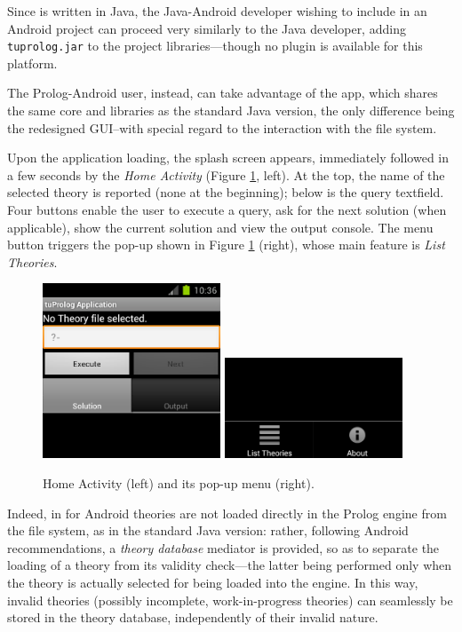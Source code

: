 Since \tuprolog{} is written in Java, the Java-Android developer wishing to include \tuprolog{} in an Android project can proceed very similarly to the Java developer, adding \texttt{tuprolog.jar} to the project libraries---though no plugin is available for this platform.

The Prolog-Android user, instead, can take advantage of the \tuprolog{} app, which shares the same core and libraries as the standard Java version, the only difference being the redesigned GUI--with special regard to the interaction with the file system.

Upon the application loading, the splash screen appears, immediately followed in a few seconds by the \textit{Home Activity} (Figure \ref{fig:android12}, left).
%
At the top, the name of the selected theory is reported (none at the beginning); below is the query textfield.
%
Four buttons enable the user to execute a query, ask for the next solution (when applicable), show the current solution and view the output console.
%
The menu button triggers the pop-up shown in Figure \ref{fig:android12} (right), whose main feature is \textit{List Theories}.

\begin{figure}
  \includegraphics[width=200px]{images/android1.png}
  \includegraphics[width=200px]{images/android2.png}
  \caption{Home Activity (left) and its pop-up menu (right).}\label{fig:android12}
\end{figure}

Indeed, in \tuprolog{} for Android theories are not loaded directly in the Prolog engine from the file system, as in the standard Java version: rather, following Android recommendations, a \textit{theory database} mediator is provided, so as to separate the loading of a theory from its validity check---the latter being performed only when the theory is actually selected for being loaded into the engine. In this way, invalid theories (possibly incomplete, work-in-progress theories) can seamlessly be stored in the theory database, independently of their invalid nature.

